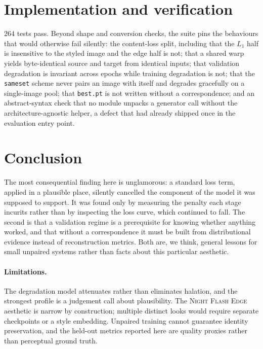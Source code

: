 \documentclass[11pt,a4paper]{article}
\newcommand{\code}[1]{\texttt{#1}}
\newcommand{\method}{\textsc{Night Flash Edge}}
\begin{document}
\section{Implementation and verification}
\label{sec:impl}

$264$ tests pass. Beyond shape and conversion checks, the suite pins the
behaviours that would otherwise fail silently: the content-loss split, including
that the $L_1$ half is insensitive to the styled image and the edge half is not;
that a shared warp yields byte-identical source and target from identical inputs;
that validation degradation is invariant across epochs while training degradation
is not; that the \code{sameset} scheme never pairs an image with itself and
degrades gracefully on a single-image pool; that \code{best.pt} is not written
without a correspondence; and an abstract-syntax check that no module unpacks a
generator call without the architecture-agnostic helper, a defect that had already
shipped once in the evaluation entry point.

\section{Conclusion}

The most consequential finding here is unglamorous: a standard loss term, applied
in a plausible place, silently cancelled the component of the model it was
supposed to support. It was found only by measuring the penalty each stage
incurits rather than by inspecting the loss curve, which continued to fall. The
second is that a validation regime is a prerequisite for knowing whether anything
worked, and that without a correspondence it must be built from
distributional evidence instead of reconstruction metrics. Both are, we think,
general lessons for small unpaired systems rather than facts about this
particular aesthetic.

\paragraph{Limitations.} The degradation model attenuates rather than eliminates
halation, and the strongest profile is a judgement call about plausibility. The
\method{} aesthetic is narrow by construction; multiple distinct looks would
require separate checkpoints or a style embedding. Unpaired training cannot
guarantee identity preservation, and the held-out metrics reported here are
quality proxies rather than perceptual ground truth.
\end{document}
